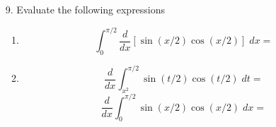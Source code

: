 \documentclass[11pt,reqno]{article}
\theoremstyle{definition}
\begin{document}
\begin{enumerate}
		\item[9.] Evaluate the following expressions
		\begin{enumerate}
			\item $$\int_{0}^{\pi/2} \frac{d}{dx}[\sin(x/2)\cos(x/2)] \; dx = $$ 
			\vspace{2in}
			\item $$ \frac{d}{dx} \int_{x^2}^{\pi/2} \sin(t/2)\cos(t/2) \; dt = $$ 
			\vspace{2in} $$\frac{d}{dx} \int_{0}^{\pi/2} \sin(x/2)\cos(x/2) \; dx = $$
		\end{enumerate}
	
	\end{enumerate}
	
	
\end{document}
